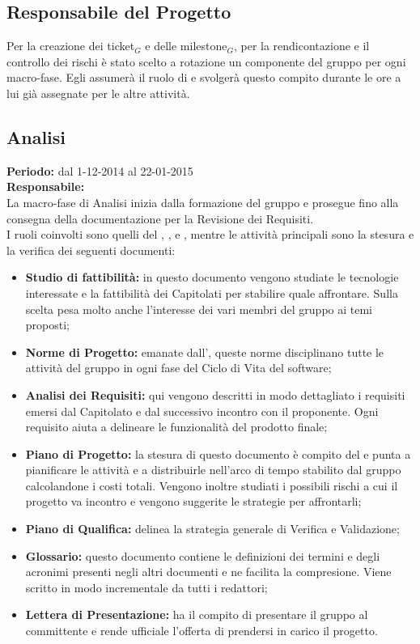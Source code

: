 \subsection{Responsabile del Progetto}
Per la creazione dei ticket$_{G}$ e delle milestone$_{G}$, per la rendicontazione e il controllo dei rischi è stato scelto a rotazione un componente del gruppo per ogni macro-fase.
Egli assumerà il ruolo di \ruoloResponsabile{} e svolgerà questo compito durante le ore a lui già assegnate per le altre attività.

\newpage
\subsection{Analisi}
\textbf{Periodo:} dal 1-12-2014 al 22-01-2015 \\
\textbf{Responsabile:} \VeFe \\
La macro-fase di Analisi inizia dalla formazione del gruppo e prosegue fino alla consegna della documentazione per la Revisione dei Requisiti. \\
I ruoli coinvolti sono quelli del \ruoloResponsabile{}, \ruoloAmministratore{}, \ruoloVerificatore{} e \ruoloAnalista{}, mentre le attività principali sono la stesura e la verifica dei seguenti documenti:

\begin{itemize}
\item \textbf{Studio di fattibilità:} in questo documento vengono studiate le tecnologie interessate e la fattibilità dei Capitolati per stabilire quale affrontare. Sulla scelta pesa molto anche l'interesse dei vari membri del gruppo ai temi proposti;
\item \textbf{Norme di Progetto:} emanate dall'\ruoloAmministratore{}, queste norme disciplinano tutte le attività del gruppo in ogni fase del Ciclo di Vita del software;
\item \textbf{Analisi dei Requisiti:} qui vengono descritti in modo dettagliato i requisiti emersi dal Capitolato e dal successivo incontro con il proponente. Ogni requisito aiuta a delineare le funzionalità del prodotto finale;
\item \textbf{Piano di Progetto:} la stesura di questo documento è compito del \ruoloResponsabile{} e punta a pianificare le attività e a distribuirle nell'arco di tempo stabilito dal gruppo calcolandone i costi totali. Vengono inoltre studiati i possibili rischi a cui il progetto va incontro e vengono suggerite le strategie per affrontarli;
\item \textbf{Piano di Qualifica:} delinea la strategia generale di Verifica e Validazione;
\item \textbf{Glossario:} questo documento contiene le definizioni dei termini e degli acronimi presenti negli altri documenti e ne facilita la compresione. Viene scritto in modo incrementale da tutti i redattori;
\item \textbf{Lettera di Presentazione:} ha il compito di presentare il gruppo al committente e rende ufficiale l'offerta di prendersi in carico il progetto.
\end{itemize}

